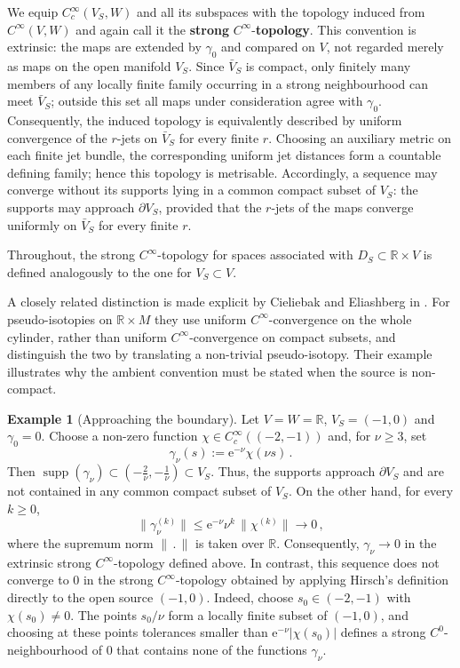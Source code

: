 \documentclass{amsart}
\theoremstyle{definition}
\newtheorem{exwith}[prop]{Example}
\newcommand{\rme}{\mathrm e}
\newcommand{\R}{\mathbb R}
\newcommand{\lra}{\longrightarrow}
\newcommand{\ra}{\rightarrow}
\DeclareMathOperator{\supp}{\mathrm{supp}}
\begin{document}
We equip $C_c^{\infty}(V_S,W)$ and all its subspaces
with the topology induced from $C^{\infty}(V,W)$
and again call it the {\bf strong} $C^{\infty}$-{\bf topology}.
This convention is extrinsic:
the maps are extended by $\gamma_0$ and compared on $V$,
not regarded merely as maps on the open manifold $V_S$.
Since $\bar{V}_S$ is compact,
only finitely many members of any locally finite family
occurring in a strong neighbourhood
can meet $\bar{V}_S$;
outside this set all maps under consideration
agree with $\gamma_0$.
Consequently, the induced topology is equivalently described
by uniform convergence of the $r$-jets on $\bar{V}_S$
for every finite $r$.
Choosing an auxiliary metric on each finite jet bundle,
the corresponding uniform jet distances form
a countable defining family;
hence this topology is metrisable.
Accordingly, a sequence may converge without its supports
lying in a common compact subset of $V_S$:
the supports may approach $\partial V_S$,
provided that the $r$-jets of the maps converge uniformly
on $\bar{V}_S$ for every finite $r$.

Throughout, the strong $C^{\infty}$-topology
for spaces associated with $D_S\subset\R\times V$
is defined analogously to the one for $V_S\subset V$.

A closely related distinction is made explicit
by Cieliebak and Eliashberg in \cite[Section~6.3, p.~37]{ce14}.
For pseudo-isotopies on $\R\times M$
they use uniform $C^{\infty}$-convergence on the whole cylinder,
rather than uniform $C^{\infty}$-convergence on compact subsets,
and distinguish the two by translating
a non-trivial pseudo-isotopy.
Their example illustrates why the ambient convention
must be stated when the source is non-compact.


\begin{exwith}[Approaching the boundary]
Let $V=W=\R$, $V_S=(-1,0)$ and $\gamma_0=0$.
Choose a non-zero function
$\chi\in C_c^\infty((-2,-1))$
and, for $\nu\geq3$, set
\[
\gamma_\nu(s):=
\rme^{-\nu}\chi(\nu s)
\,.
\]
Then
$\supp(\gamma_\nu)\subset
\left(-\frac{2}{\nu},-\frac{1}{\nu}\right)
\subset V_S$.
Thus, the supports approach $\partial V_S$
and are not contained in any common compact subset of $V_S$.
On the other hand, for every $k\geq0$,
\[
\big\|\gamma_\nu^{(k)}\big\|
\leq
\rme^{-\nu}\nu^k\,
\big\|\chi^{(k)}\big\|
\lra 0
\,,
\]
where the supremum norm $\|\,.\,\|$
is taken over $\R$.
Consequently, $\gamma_\nu\ra0$
in the extrinsic strong $C^\infty$-topology
defined above.
In contrast, this sequence does not converge to $0$
in the strong $C^\infty$-topology obtained by applying
Hirsch's definition directly to the open source $(-1,0)$.
Indeed, choose $s_0\in(-2,-1)$
with $\chi(s_0)\neq0$.
The points $s_0/\nu$ form a locally finite subset
of $(-1,0)$, and choosing at these points
tolerances smaller than
$\rme^{-\nu}|\chi(s_0)|$
defines a strong $C^0$-neighbourhood of $0$
that contains none of the functions $\gamma_\nu$.
\end{exwith}
\end{document}
